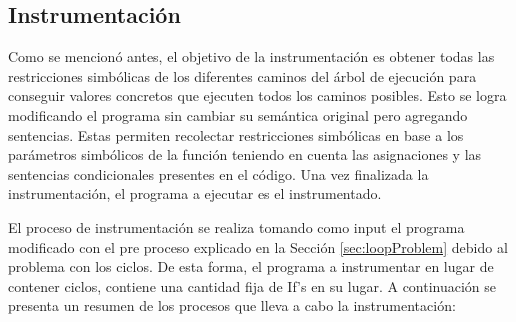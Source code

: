\documentclass{llncs}
\begin{document}
\subsection{Instrumentación}
Como se mencionó antes, el objetivo de la instrumentación es obtener todas las restricciones simbólicas de los diferentes caminos del árbol de
ejecución para conseguir valores concretos que ejecuten todos los caminos posibles. Esto se logra modificando el programa sin cambiar su semántica original
pero agregando sentencias. Estas permiten recolectar restricciones simbólicas en base a los parámetros simbólicos de la función teniendo en cuenta las asignaciones
y las sentencias condicionales presentes en el código. Una vez finalizada la instrumentación, el programa a ejecutar es el instrumentado.

El proceso de instrumentación se realiza tomando como input el programa modificado con el pre proceso explicado en la Sección \ref{sec:loopProblem}
debido al problema con los ciclos. De esta forma, el programa a instrumentar en lugar de contener ciclos, contiene una cantidad fija de If’s en su lugar.
A continuación se presenta un resumen de los procesos que lleva a cabo la instrumentación:
\end{document}
